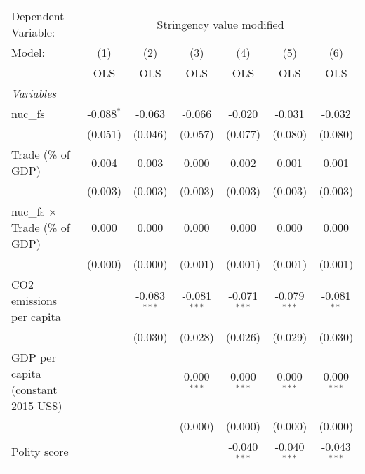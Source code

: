
\begingroup
\centering
\begin{tabular}{lcccccc}
   \toprule
   Dependent Variable: & \multicolumn{6}{c}{Stringency value modified}\\
   Model:                                & (1)          & (2)            & (3)            & (4)            & (5)            & (6)\\  
                                         &  OLS         & OLS            & OLS            & OLS            & OLS            & OLS\\  
   \midrule
   \emph{Variables}\\
   nuc\_fs                               & -0.088$^{*}$ & -0.063         & -0.066         & -0.020         & -0.031         & -0.032\\   
                                         & (0.051)      & (0.046)        & (0.057)        & (0.077)        & (0.080)        & (0.080)\\   
   Trade (\% of GDP)                     & 0.004        & 0.003          & 0.000          & 0.002          & 0.001          & 0.001\\   
                                         & (0.003)      & (0.003)        & (0.003)        & (0.003)        & (0.003)        & (0.003)\\   
   nuc\_fs $\times$ Trade (\% of GDP)    & 0.000        & 0.000          & 0.000          & 0.000          & 0.000          & 0.000\\   
                                         & (0.000)      & (0.000)        & (0.001)        & (0.001)        & (0.001)        & (0.001)\\   
   CO2 emissions per capita              &              & -0.083$^{***}$ & -0.081$^{***}$ & -0.071$^{***}$ & -0.079$^{***}$ & -0.081$^{**}$\\   
                                         &              & (0.030)        & (0.028)        & (0.026)        & (0.029)        & (0.030)\\   
   GDP per capita (constant 2015 US\$)   &              &                & 0.000$^{***}$  & 0.000$^{***}$  & 0.000$^{***}$  & 0.000$^{***}$\\   
                                         &              &                & (0.000)        & (0.000)        & (0.000)        & (0.000)\\   
   Polity score                          &              &                &                & -0.040$^{***}$ & -0.040$^{***}$ & -0.043$^{***}$\\   

\end{tabular}

